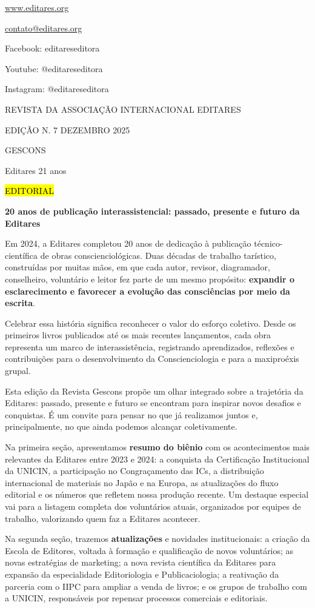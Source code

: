 \documentclass[
]{article}
\begin{document}
\href{http://www.editares.org}{\ul{www.editares.org}}

\href{mailto:contato@editares.org}{\ul{contato@editares.org}}

Facebook: editareseditora

Youtube: @editareseditora

Instagram: @editareseditora

REVISTA DA ASSOCIAÇÃO INTERNACIONAL EDITARES

EDIÇÃO N. 7 \textbar{} DEZEMBRO \textbar{} 2025

GESCONS

Editares 21 anos

\hl{EDITORIAL}

\textbf{20 anos de publicação interassistencial: passado, presente e futuro da Editares}

Em 2024, a Editares completou 20 anos de dedicação à publicação técnico-científica de obras conscienciológicas. Duas décadas de trabalho tarístico, construídas por muitas mãos, em que cada autor, revisor, diagramador, conselheiro, voluntário e leitor fez parte de um mesmo propósito: \textbf{expandir o esclarecimento e favorecer a evolução das consciências por meio da escrita}.

Celebrar essa história significa reconhecer o valor do esforço coletivo. Desde os primeiros livros publicados até os mais recentes lançamentos, cada obra representa um marco de interassistência, registrando aprendizados, reflexões e contribuições para o desenvolvimento da Conscienciologia e para a maxiproéxis grupal.

Esta edição da Revista Gescons propõe um olhar integrado sobre a trajetória da Editares: passado, presente e futuro se encontram para inspirar novos desafios e conquistas. É um convite para pensar no que já realizamos juntos e, principalmente, no que ainda podemos alcançar coletivamente.

Na primeira seção, apresentamos \textbf{resumo do biênio} com os acontecimentos mais relevantes da Editares entre 2023 e 2024: a conquista da Certificação Institucional da UNICIN, a participação no Congraçamento das ICs, a distribuição internacional de materiais no Japão e na Europa, as atualizações do fluxo editorial e os números que refletem nossa produção recente. Um destaque especial vai para a listagem completa dos voluntários atuais, organizados por equipes de trabalho, valorizando quem faz a Editares acontecer.

Na segunda seção, trazemos \textbf{atualizações} e novidades institucionais: a criação da Escola de Editores, voltada à formação e qualificação de novos voluntários; as novas estratégias de marketing; a nova revista científica da Editares para expansão da especialidade Editoriologia e Publicaciologia; a reativação da parceria com o IIPC para ampliar a venda de livros; e os grupos de trabalho com a UNICIN, responsáveis por repensar processos comerciais e editoriais.
\end{document}

